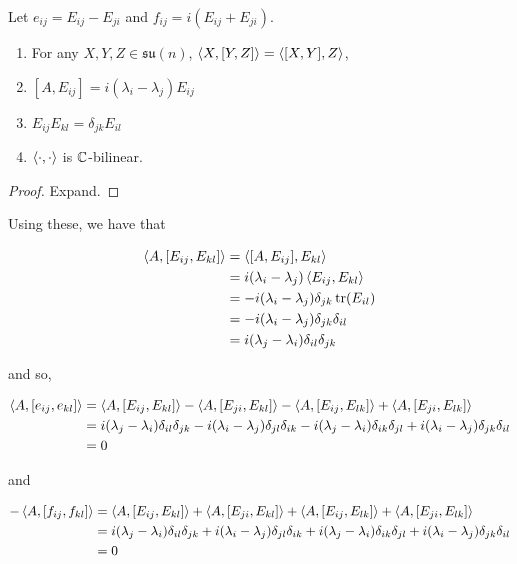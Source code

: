 \documentclass{article}
\newcommand{\su}{\mathfrak{su}}
\begin{document}
Let \(e_{ij} = E_{ij} - E_{ji}\) and \(f_{ij} = i(E_{ij} + E_{ji})\).

\begin{lemma}
    \begin{enumerate}
        \item For any \(X, Y, Z \in \su(n)\), \(\left\langle X, [Y, Z] \right\rangle = \left\langle [X, Y], Z \right\rangle\),
        \item \([A, E_{ij}] = i(\lambda_i - \lambda_j)E_{ij}\)
        \item \(E_{ij}E_{kl} = \delta_{jk}E_{il}\)
        \item \(\left\langle \cdot, \cdot \right\rangle\) is \(\mathbb{C}\)-bilinear.
    \end{enumerate}
\end{lemma}

\begin{proof}
    Expand.
\end{proof}

Using these, we have that

\begin{align*}
    \left\langle A, [E_{ij}, E_{kl}] \right\rangle &= \left\langle [A, E_{ij}], E_{kl} \right\rangle \\
    &= i(\lambda_i - \lambda_j)\left\langle E_{ij}, E_{kl} \right\rangle \\
    &= -i(\lambda_i - \lambda_j)\delta_{jk}\tr(E_{il}) \\
    &= -i(\lambda_i - \lambda_j)\delta_{jk}\delta_{il} \\
    &= i(\lambda_j - \lambda_i)\delta_{il}\delta_{jk}
\end{align*}

and so,

\begin{align*}
    \left\langle A, [e_{ij}, e_{kl}] \right\rangle &= \left\langle A, [E_{ij}, E_{kl}] \right\rangle - \left\langle A, [E_{ji}, E_{kl}] \right\rangle - \left\langle A, [E_{ij}, E_{lk}] \right\rangle + \left\langle A, [E_{ji}, E_{lk}] \right\rangle \\
    &= i(\lambda_j - \lambda_i)\delta_{il}\delta_{jk} - i(\lambda_i - \lambda_j)\delta_{jl}\delta_{ik} - i(\lambda_j - \lambda_i)\delta_{ik}\delta_{jl} + i(\lambda_i - \lambda_j)\delta_{jk}\delta_{il} \\
    &= 0
\end{align*}

and

\begin{align*}
    -\left\langle A, [f_{ij}, f_{kl}] \right\rangle &= \left\langle A, [E_{ij}, E_{kl}] \right\rangle + \left\langle A, [E_{ji}, E_{kl}] \right\rangle + \left\langle A, [E_{ij}, E_{lk}] \right\rangle + \left\langle A, [E_{ji}, E_{lk}] \right\rangle \\
    &= i(\lambda_j - \lambda_i)\delta_{il}\delta_{jk} + i(\lambda_i - \lambda_j)\delta_{jl}\delta_{ik} + i(\lambda_j - \lambda_i)\delta_{ik}\delta_{jl} + i(\lambda_i - \lambda_j)\delta_{jk}\delta_{il} \\
    &= 0
\end{align*}
\end{document}
